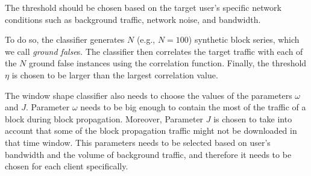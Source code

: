  The threshold should be chosen based on the target user's specific network conditions such as background traffic, network noise, and bandwidth. %


To do so, the classifier generates $N$ (e.g., $N=100$) synthetic block series, which we call \emph{ground false}s. The classifier then correlates the target traffic with each of the $N$ ground false instances using the correlation function. Finally, the threshold $\eta$ is chosen to be larger than the largest correlation value.


\begin{comment}
\begin{align}\label{gt_gf}
\eta > \max(CF) 
\end{align}
where $CF$ is the set of correlation values against the $N$ ground false instances. In another words, we choose $\eta$ to be larger than the largest correlation value.
\end{comment}

 The window shape classifier also needs to choose the values of the parameters $\omega$ and $J$. Parameter $\omega$ needs to be big enough to contain the most of the traffic of a block during block propagation. Moreover, Parameter $J$ is chosen to take into account that some  of the block propagation traffic might not be downloaded in that time window. This parameters needs to be selected based on user's bandwidth and the volume of background traffic, and therefore it needs to be chosen for each client specifically. 



\iffalse The window size parameter \textbf{\textit{$\omega$}} represents the delay for a client to fully receive a specific block. Therefore, it should be based on two features: propagation delay and download time. The propagation delay is usually smaller than the download time so we ignore it in choosing \textit{$\omega$}. 
We estimate a target client's block downloading time as $\frac{block\ size}{client's\ bandwidth}$.The parameter $J$ represents natural network jitter for the target client. To derive $J$ for each user, we derive the difference of traffic volume in the user's consecutive time windows, excluding the windows that arrive close to the times of blocks (note that we do not know if this is a \bc client or not). In other words, we measure $\Delta V$'s for windows that do not collide with block times.  
 $J$ is the standard deviation of such difference values.\fi

